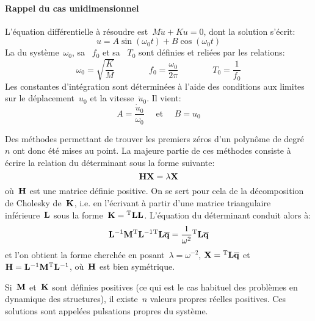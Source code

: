 \paragraph{Rappel du cas unidimensionnel}
L'équation différentielle à résoudre est~$M\ddot{u}+Ku=0$,
dont la solution s'écrit: \begin{equation} u=A\sin (\omega_0 t)+B\cos(\omega_0 t) \end{equation}
La  du système~$\omega_0$, sa ~$f_0$ et sa ~$T_0$ sont définies et reliées par les relations:
\begin{equation}
\omega_0=\sqrt{\dfrac{K}M} \qquad\qquad f_0=\dfrac{\omega_0}{2\pi} \qquad\qquad T_0=\dfrac1{f_0}
\end{equation}
Les constantes d'intégration sont déterminées à l'aide des conditions aux limites sur le déplacement~$u_0$ et la
vitesse~$\dot{u}_0$. Il vient: \begin{equation} A=\frac{\dot{u}_0}{\omega_0} \quad\text{ et }\quad B=u_0\end{equation}

\medskip{}
Des méthodes permettant de trouver les premiers zéros d'un polynôme de degré~$n$ ont donc été
mises au point.
La majeure partie de ces méthodes consiste à écrire la relation du déterminant sous la forme suivante:
\begin{equation} \MM{H}\VV{X}=\lambda\VV{X} \end{equation}
où~$\MM{H}$ est une matrice définie positive.
\medskipvm
On se sert pour cela de la décomposition de Cholesky
de~$\MM{K}$, i.e. en l'écrivant à partir d'une matrice triangulaire inférieure~$\MM{L}$ sous la forme~$\MM{K}=\MMT{L}\MM{L}$.
\medskipvm
L'équation du déterminant conduit alors à:
\begin{equation} \MMI{L}\MM{M}\MMIT{L}\MMT{L}\VV{\overline{q}}=\frac1{\omega^2}\MMT{L}\VV{\overline{q}} \end{equation}
et l'on obtient la forme cherchée en posant~$\lambda=\omega^{-2}$, $\VV{X}=\MMT{L}\VV{\overline{q}}$
et~$\MM{H}=\MMI{L}\MM{M}\MMIT{L}$, où~$\MM{H}$ est bien symétrique.

\medskip
{}
Si~$\MM{M}$ et~$\MM{K}$ sont définies positives (ce qui est le cas habituel des problèmes en dynamique
des structures), il existe~$n$ valeurs propres réelles positives. Ces solutions sont appelées
pulsations propres du système.

